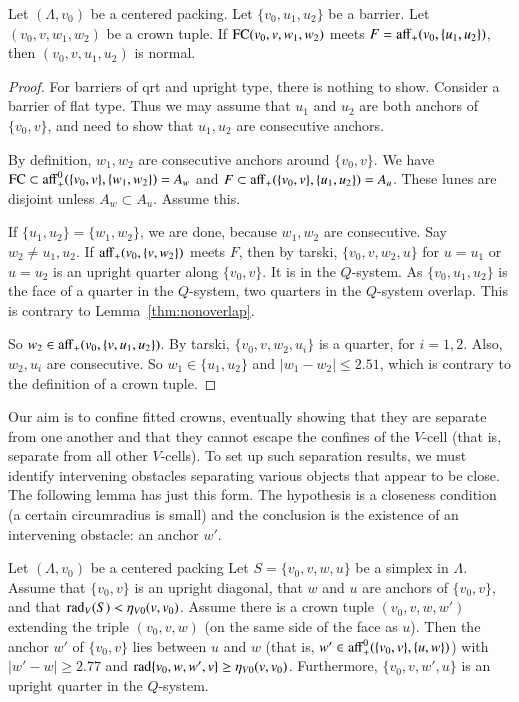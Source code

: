 \begin{lemma}
Let $(\Lambda,v_0)$ be a centered packing.  Let $\{v_0,u_1,u_2\}$
be a barrier.  Let $(v_0,v,w_1,w_2)$ be a crown tuple.  If
${\operatorname{FC}}(v_0,v,w_1,w_2)$ meets $F={\operatorname{aff}}_+(v_0,\{u_1,u_2\})$, then
$(v_0,v,u_1,u_2)$ is normal.
\end{lemma}

\begin{proof} For barriers of qrt and upright type, there is nothing to show.  Consider
a barrier of flat type.  Thus we may assume that $u_1$ and $u_2$ are both anchors of
$\{v_0,v\}$, and need to show that $u_1,u_2$ are consecutive anchors.

By definition, $w_1,w_2$ are consecutive anchors around $\{v_0,v\}$.
We have ${\operatorname{FC}}\subset {\operatorname{aff}}_+^0(\{v_0,v\},\{w_1,w_2\}) = A_w$
and $F\subset {\operatorname{aff}}_+(\{v_0,v\},\{u_1,u_2\}) = A_u$.
These lunes are disjoint unless $A_w \subset A_u$.  Assume this.

If $\{u_1,u_2\}=\{w_1,w_2\}$, we are done, because $w_1,w_2$ are consecutive.
Say $w_2\ne u_1,u_2$.  If ${\operatorname{aff}}_+(v_0,\{v,w_2\})$ meets $F$, then by tarski,
$\{v_0,v,w_2,u\}$ for $u=u_1$ or $u=u_2$ is an upright quarter along $\{v_0,v\}$.  It
is in the $Q$-system.  As $\{v_0,u_1,u_2\}$ is the face of a quarter in the $Q$-system,
two quarters in the $Q$-system overlap. 
This is contrary to Lemma~\ref{thm:nonoverlap}.

So $w_2\in{\operatorname{aff}}_+(v_0,\{v,u_1,u_2\})$.  By tarski,
 $\{v_0,v,w_2,u_i\}$ is a quarter, for
$i=1,2$.  Also, $w_2,u_i$ are consecutive.  So $w_1\in\{u_1,u_2\}$ and $|w_1-w_2|\le 2.51$,
which is contrary to the definition of a crown tuple.
\end{proof}

Our aim is to confine fitted crowns, eventually showing that they are separate
from one another 
and that they cannot escape the confines of the $V$-cell (that is, separate from
all other $V$-cells).  To set up such separation results, we must 
identify intervening obstacles separating various objects that appear to
be close.
The following lemma has just this form.  The hypothesis
is a closeness condition (a certain circumradius is small) and the conclusion is the
existence of an intervening obstacle: an anchor $w'$.

\begin{lemma}
Let $(\Lambda,v_0)$ be a centered packing
  Let $S=\{v_0,v,w,u\}$ be a simplex in $\Lambda$.  Assume that $\{v_0,v\}$ is an
upright diagonal, that $w$ and $u$
are anchors of $\{v_0,v\}$, and that $\operatorname{rad}_V(S)< \eta_{V0}(v,v_0)$.
Assume there is a crown tuple $(v_0,v,w,w')$
extending the triple $(v_0,v,w)$
(on the same side of the face as $u$).  
Then the anchor $w'$ of $\{v_0,v\}$ lies between $u$ and $w$
(that is,  $w'\in{\operatorname{aff}}_+^0(\{v_0,v\},\{u,w\})$) with
    $|w'-w|\ge2.77$ and
    $\operatorname{rad}\{v_0,w,w',v\} \ge \eta_{V0}(v,v_0)$.
Furthermore, $\{v_0,v,w',u\}$ is an upright quarter in the $Q$-system.
\end{lemma}

